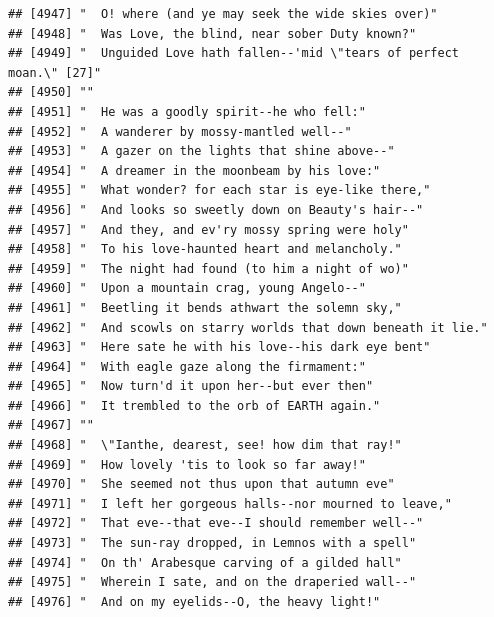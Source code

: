\documentclass{article}\usepackage[]{graphicx}\usepackage[]{color}
\makeatletter
\newenvironment{kframe}{%
 \def\at@end@of@kframe{}%
 \ifinner\ifhmode%
  \def\at@end@of@kframe{\end{minipage}}%
  \begin{minipage}{\columnwidth}%
 \fi\fi%
 \def\FrameCommand##1{\hskip\@totalleftmargin \hskip-\fboxsep
 \colorbox{shadecolor}{##1}\hskip-\fboxsep
     \hskip-\linewidth \hskip-\@totalleftmargin \hskip\columnwidth}%
 \MakeFramed {\advance\hsize-\width
   \@totalleftmargin\z@ \linewidth\hsize
   \@setminipage}}%
 {\par\unskip\endMakeFramed%
 \at@end@of@kframe}
\newenvironment{knitrout}{}{} %
\makeatother
\begin{document}
\begin{knitrout}
\begin{kframe}
\begin{verbatim}
## [4947] "  O! where (and ye may seek the wide skies over)"                            
## [4948] "  Was Love, the blind, near sober Duty known?"                               
## [4949] "  Unguided Love hath fallen--'mid \"tears of perfect moan.\" [27]"           
## [4950] ""                                                                            
## [4951] "  He was a goodly spirit--he who fell:"                                      
## [4952] "  A wanderer by mossy-mantled well--"                                        
## [4953] "  A gazer on the lights that shine above--"                                  
## [4954] "  A dreamer in the moonbeam by his love:"                                    
## [4955] "  What wonder? for each star is eye-like there,"                             
## [4956] "  And looks so sweetly down on Beauty's hair--"                              
## [4957] "  And they, and ev'ry mossy spring were holy"                                
## [4958] "  To his love-haunted heart and melancholy."                                 
## [4959] "  The night had found (to him a night of wo)"                                
## [4960] "  Upon a mountain crag, young Angelo--"                                      
## [4961] "  Beetling it bends athwart the solemn sky,"                                 
## [4962] "  And scowls on starry worlds that down beneath it lie."                     
## [4963] "  Here sate he with his love--his dark eye bent"                             
## [4964] "  With eagle gaze along the firmament:"                                      
## [4965] "  Now turn'd it upon her--but ever then"                                     
## [4966] "  It trembled to the orb of EARTH again."                                    
## [4967] ""                                                                            
## [4968] "  \"Ianthe, dearest, see! how dim that ray!"                                 
## [4969] "  How lovely 'tis to look so far away!"                                      
## [4970] "  She seemed not thus upon that autumn eve"                                  
## [4971] "  I left her gorgeous halls--nor mourned to leave,"                          
## [4972] "  That eve--that eve--I should remember well--"                              
## [4973] "  The sun-ray dropped, in Lemnos with a spell"                               
## [4974] "  On th' Arabesque carving of a gilded hall"                                 
## [4975] "  Wherein I sate, and on the draperied wall--"                               
## [4976] "  And on my eyelids--O, the heavy light!"                                    

\end{verbatim}
\end{kframe}
\end{knitrout}
\end{document}
